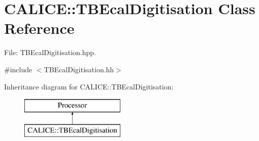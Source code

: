 \section{C\-A\-L\-I\-C\-E\-:\-:T\-B\-Ecal\-Digitisation Class Reference}
\label{classCALICE_1_1TBEcalDigitisation}


File\-: T\-B\-Ecal\-Digitisation.\-hpp.  




{\ttfamily \#include $<$T\-B\-Ecal\-Digitisation.\-hh$>$}

Inheritance diagram for C\-A\-L\-I\-C\-E\-:\-:T\-B\-Ecal\-Digitisation\-:\begin{figure}[H]
\begin{center}
\leavevmode
\includegraphics[height=2.000000cm]{classCALICE_1_1TBEcalDigitisation}
\end{center}
\end{figure}
